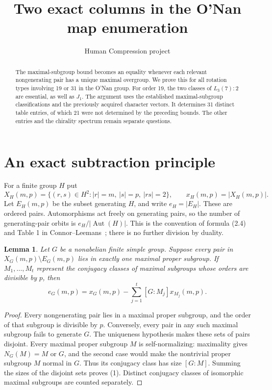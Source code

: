 \documentclass[11pt,a4paper]{article}
\title{Two exact columns in the O'Nan map enumeration}
\author{Human Compression project}
\date{}
\newtheorem{lemma}[theorem]{Lemma}
\newcommand{\Aut}{\operatorname{Aut}}
\begin{document}
\maketitle
\begin{abstract}
The maximal-subgroup bound becomes an equality whenever each relevant
nongenerating pair has a unique maximal overgroup. We prove this for
all rotation types involving 19 or 31 in the O'Nan group. For order 19,
the two classes of $L_3(7):2$ are essential, as well as $J_1$.
The argument uses the established maximal-subgroup classifications and
the previously acquired character vectors. It determines 31 distinct
table entries, of which 21 were not determined by the preceding bounds.
The other entries and the chirality spectrum remain separate questions.
\end{abstract}

\section{An exact subtraction principle}
For a finite group $H$ put
\[
 X_H(m,p)=\{(r,s)\in H^2: |r|=m,\ |s|=p,\ |rs|=2\},
 \qquad x_H(m,p)=|X_H(m,p)|.
\]
Let $E_H(m,p)$ be the subset generating $H$, and write $e_H=|E_H|$.
These are ordered pairs. Automorphisms act freely on generating pairs,
so the number of generating-pair orbits is $e_H/|\Aut(H)|$.
This is the convention of formula (2.4) and Table 1 in
Connor--Leemans~\cite{CL}; there is no further division by duality.

\begin{lemma}\label{unique}
Let $G$ be a nonabelian finite simple group. Suppose every pair in
$X_G(m,p)\setminus E_G(m,p)$ lies in exactly one maximal proper subgroup.
If $M_1,\ldots,M_t$ represent the conjugacy classes of maximal subgroups
whose orders are divisible by $p$, then
\[
 e_G(m,p)=x_G(m,p)-\sum_{j=1}^t[G:M_j]x_{M_j}(m,p). \tag{1}
\]
\end{lemma}
\begin{proof}
Every nongenerating pair lies in a maximal proper subgroup, and the
order of that subgroup is divisible by $p$. Conversely, every pair in
any such maximal subgroup fails to generate $G$. The uniqueness
hypothesis makes these sets of pairs disjoint. Every maximal proper
subgroup $M$ is self-normalizing: maximality gives $N_G(M)=M$ or $G$,
and the second case would make the nontrivial proper subgroup $M$
normal in $G$. Thus its conjugacy class has size $[G:M]$. Summing the
sizes of the disjoint sets proves (1). Distinct conjugacy classes of
isomorphic maximal subgroups are counted separately.
\end{proof}
\end{document}
